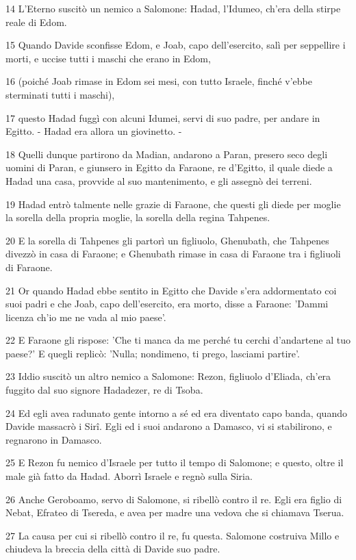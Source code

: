 \par 14 L'Eterno suscitò un nemico a Salomone: Hadad, l'Idumeo, ch'era della stirpe reale di Edom.
\par 15 Quando Davide sconfisse Edom, e Joab, capo dell'esercito, salì per seppellire i morti, e uccise tutti i maschi che erano in Edom,
\par 16 (poiché Joab rimase in Edom sei mesi, con tutto Israele, finché v'ebbe sterminati tutti i maschi),
\par 17 questo Hadad fuggì con alcuni Idumei, servi di suo padre, per andare in Egitto. - Hadad era allora un giovinetto. -
\par 18 Quelli dunque partirono da Madian, andarono a Paran, presero seco degli uomini di Paran, e giunsero in Egitto da Faraone, re d'Egitto, il quale diede a Hadad una casa, provvide al suo mantenimento, e gli assegnò dei terreni.
\par 19 Hadad entrò talmente nelle grazie di Faraone, che questi gli diede per moglie la sorella della propria moglie, la sorella della regina Tahpenes.
\par 20 E la sorella di Tahpenes gli partorì un figliuolo, Ghenubath, che Tahpenes divezzò in casa di Faraone; e Ghenubath rimase in casa di Faraone tra i figliuoli di Faraone.
\par 21 Or quando Hadad ebbe sentito in Egitto che Davide s'era addormentato coi suoi padri e che Joab, capo dell'esercito, era morto, disse a Faraone: 'Dammi licenza ch'io me ne vada al mio paese'.
\par 22 E Faraone gli rispose: 'Che ti manca da me perché tu cerchi d'andartene al tuo paese?' E quegli replicò: 'Nulla; nondimeno, ti prego, lasciami partire'.
\par 23 Iddio suscitò un altro nemico a Salomone: Rezon, figliuolo d'Eliada, ch'era fuggito dal suo signore Hadadezer, re di Tsoba.
\par 24 Ed egli avea radunato gente intorno a sé ed era diventato capo banda, quando Davide massacrò i Sirî. Egli ed i suoi andarono a Damasco, vi si stabilirono, e regnarono in Damasco.
\par 25 E Rezon fu nemico d'Israele per tutto il tempo di Salomone; e questo, oltre il male già fatto da Hadad. Aborrì Israele e regnò sulla Siria.
\par 26 Anche Geroboamo, servo di Salomone, si ribellò contro il re. Egli era figlio di Nebat, Efrateo di Tsereda, e avea per madre una vedova che si chiamava Tserua.
\par 27 La causa per cui si ribellò contro il re, fu questa. Salomone costruiva Millo e chiudeva la breccia della città di Davide suo padre.
